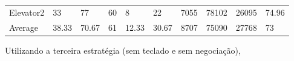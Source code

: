 \documentclass[a4paper]{article}
\begin{document}
\begin{table}[h]
\begin{tabular}{@{}llllllllll@{}}
Elevator2 & 33       & 77            & 60           & 8                                                               & 22                                                                  & 7055                                                         & 78102                                                 & 26095                                                   & 74.96         \\
Average   & 38.33     & 70.67         & 61        & 12.33                                                            & 30.67                                                               & 8707                                                         & 75090                                                 & 27768                                                   &  73         \\ \bottomrule
\end{tabular}
\end{table}

Utilizando a terceira estratégia (sem teclado e sem negociação),
\end{document}
